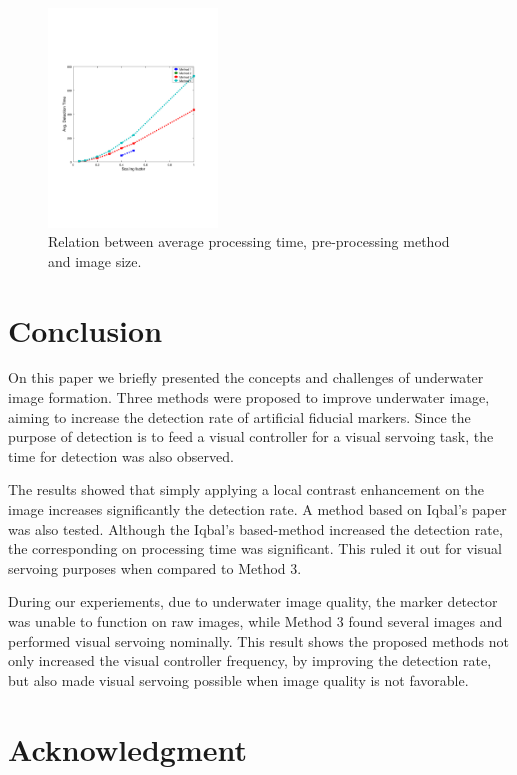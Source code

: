 \documentclass[conference, letterpaper]{IEEEtran}
\begin{document}
\begin{figure}[!ht]
	\centering
    \includegraphics[width=0.4\textwidth, trim={1.6cm 6.9cm 2.3cm 6.7cm}]{./fig/detection_time2_emb.pdf}
    \caption{Relation between average processing time, pre-processing method and image size.}
	\label{fig:detection_time2}
\end{figure}

\section{Conclusion} \label{sec:concl}

On this paper we briefly presented the concepts and challenges of underwater
image formation. Three methods were proposed to improve underwater
image, aiming to increase the detection rate of artificial fiducial markers.
Since the purpose of detection is to feed a visual controller for a visual
servoing task, the time for detection was also observed.

The results showed that simply applying a local contrast enhancement on the
image increases significantly the detection rate. A method based on Iqbal's
paper was also tested. Although the Iqbal's based-method increased the
detection rate, the corresponding on processing time was significant.
This ruled it out for visual servoing purposes when compared to
Method 3.

During our experiements, due to underwater image quality, the marker
detector was unable to function on raw images, while Method 3
found several images and
performed visual servoing nominally. This result shows the proposed methods not
only increased the visual controller frequency, by improving the
detection rate, but also made visual servoing possible when image
quality is not favorable.

\section*{Acknowledgment}
\end{document}
